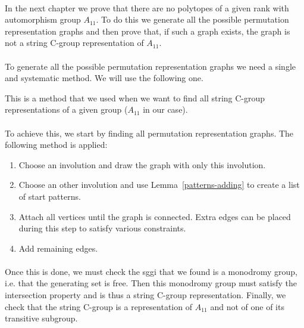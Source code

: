 \paragraph{}
In the next chapter we prove that there are no polytopes of a given rank with automorphism group $A_{11}$. To do this we generate all the possible permutation representation graphs and then prove that, if such a graph exists, the graph is not a string C-group representation of $A_{11}$.

\paragraph{}
To generate all the possible permutation representation graphs we need a single and systematic method. We will use the following one.

\begin{method}
  \label{method}
  This is a method that we used when we want to find all string C-group representations of a given group ($A_{11}$ in our case).

  \paragraph{}
  To achieve this, we start by finding all permutation representation graphs. The following method is applied:

  \begin{enumerate}
    \item Choose an involution and draw the graph with only this involution.
    \item Choose an other involution and use Lemma~\ref{patterns-adding} to create a list of start patterns.
    \item Attach all vertices until the graph is connected. Extra edges can be placed during this step to satisfy various constraints.
    \item Add remaining edges.
  \end{enumerate}

  \paragraph{}
  Once this is done, we must check the sggi that we found is a monodromy group, i.e. that the generating set is free. Then this monodromy group must satisfy the intersection property and is thus a string C-group representation. Finally, we check that the string C-group is a representation of $A_{11}$ and not of one of its transitive subgroup.

\end{method}

